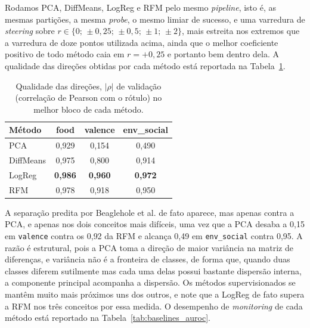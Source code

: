 Rodamos PCA, DiffMeans, LogReg e RFM pelo mesmo \textit{pipeline},
isto é, as mesmas partições, a mesma \textit{probe}, o mesmo limiar de sucesso, e uma
varredura de \textit{steering} sobre
$r \in \{0;\, \pm 0{,}25;\, \pm 0{,}5;\, \pm 1;\, \pm 2\}$, mais estreita nos extremos que a
varredura de doze pontos utilizada acima, ainda que o melhor coeficiente positivo de todo
método caia em $r = +0{,}25$ e portanto bem dentro dela. A qualidade das direções obtidas por
cada método está reportada na Tabela~\ref{tab:baselines_val_rho}.

\begin{table}[htbp]
\centering
\caption{Qualidade das direções, $|\rho|$ de validação (correlação de Pearson com o rótulo) no melhor bloco de cada método.}
\label{tab:baselines_val_rho}
\begin{tabular}{@{}lccc@{}}
\toprule
\textbf{Método} & \textbf{food} & \textbf{valence} & \textbf{env\_social} \\
\midrule
PCA        & 0{,}929 & 0{,}154 & 0{,}490 \\
DiffMeans  & 0{,}975 & 0{,}800 & 0{,}914 \\
LogReg     & \textbf{0{,}986} & \textbf{0{,}960} & \textbf{0{,}972} \\
RFM        & 0{,}978 & 0{,}918 & 0{,}950 \\
\bottomrule
\end{tabular}
\end{table}

A separação predita por Beaglehole et al. de fato aparece, mas apenas contra a PCA, e
apenas nos dois conceitos mais difíceis, uma vez que a PCA desaba a 0{,}15 em \verb|valence|
contra os 0{,}92 da RFM e alcança 0{,}49 em \verb|env_social| contra 0{,}95. A razão é
estrutural, pois a PCA toma a direção de maior variância na matriz de diferenças, e
variância não é a fronteira de classes, de forma que, quando duas classes diferem
sutilmente mas cada uma delas possui bastante dispersão interna, a componente principal
acompanha a dispersão. Os métodos supervisionados se mantêm muito mais próximos uns dos
outros, e note que a LogReg de fato supera a RFM nos três conceitos por essa
medida. O desempenho de \textit{monitoring} de cada método está reportado na
Tabela~\ref{tab:baselines_auroc}.


